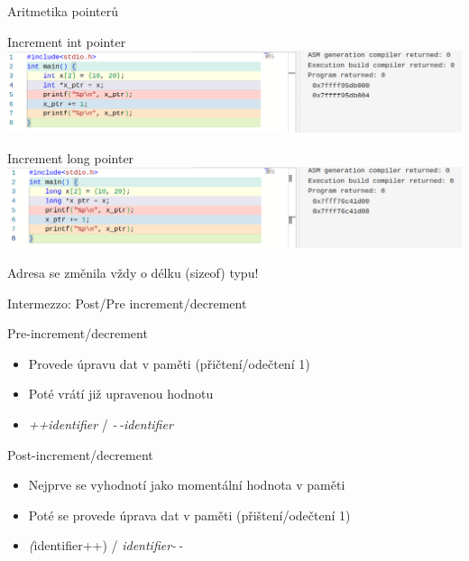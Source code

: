 \documentclass[9pt]{beamer}
\begin{document}
\begin{frame}{Aritmetika pointerů}
    \begin{block}{Increment int pointer}
        \includegraphics[width=0.95\linewidth]{lekce21/int_ptr_increment.png}
    \end{block}
    \begin{block}{Increment long pointer}
        \includegraphics[width=0.95\linewidth]{lekce21/long_ptr_increment.png}
    \end{block}
    \pause
    Adresa se změnila vždy o délku (sizeof) typu!
\end{frame}

\begin{frame}{Intermezzo: Post/Pre increment/decrement}
    \begin{block}{Pre-increment/decrement}
        \begin{itemize}
            \item Provede úpravu dat v paměti (přičtení/odečtení 1)
            \item Poté vrátí již upravenou hodnotu
            \item \textit{++identifier} / \textit{-\,-identifier}
        \end{itemize}
    \end{block}
    \begin{block}{Post-increment/decrement}
        \begin{itemize}
            \item Nejprve se vyhodnotí jako momentální hodnota v paměti
            \item Poté se provede úprava dat v paměti (přištení/odečtení 1)
            \item \textit(identifier++) / \textit{identifier-\,-}
        \end{itemize}
    \end{block}
    
\end{frame}
\end{document}
